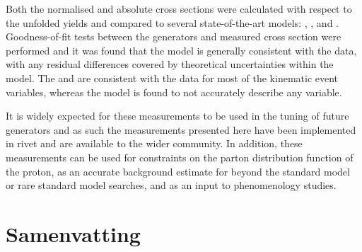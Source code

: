 Both the normalised and absolute cross sections were calculated with respect to the unfolded yields and compared to several state-of-the-art \ttbar{} models: \powhegpythia{}, \powhegherwig{}, \mgamcMLMpythia{} and \mgamcFxFxpythia{}.
Goodness-of-fit tests between the generators and measured cross section were performed and it was found that the \powhegpythia{} model is generally consistent with the data, with any residual differences covered by theoretical uncertainties within the model.
The \powhegherwig{} and \mgamcFxFxpythia{} are consistent with the data for most of the kinematic event variables, whereas the \mgamcMLMpythia{} model is found to not accurately describe any variable.

It is widely expected for these measurements to be used in the tuning of future \ttbar{} generators and as such the measurements presented here have been implemented in \acrshort{rivet} and are available to the wider community. 
In addition, these measurements can be used for constraints on the parton distribution function of the proton, as an accurate background estimate for beyond the standard model or rare standard model searches, and as an input to phenomenology studies.


\chapter*{Samenvatting}
\clearpage
